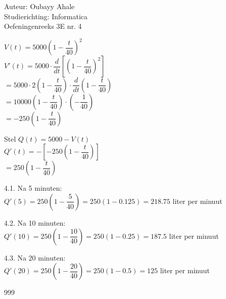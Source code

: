 \documentclass[a4paper]{article}
\begin{document}
  
\noindent \large Auteur: Oubayy Ahale          \\
\noindent \large Studierichting: Informatica   \\
\noindent \large Oefeningenreeks 3E nr. 4      \\

\medskip

\normalsize

$ V(t) = 5000 \left( 1 - \dfrac{t}{40} \right)^2 $\\

$ V'(t) = 5000 \cdot \dfrac{d}{dt} \left[ \left( 1 - \dfrac{t}{40} \right)^2 \right] $\\

$ = 5000 \cdot 2 \left( 1 - \dfrac{t}{40} \right) \cdot \dfrac{d}{dt} \left( 1 - \dfrac{t}{40} \right) $\\

$ = 10000 \left( 1 - \dfrac{t}{40} \right) \cdot \left( -\dfrac{1}{40} \right) $\\

$ = -250 \left( 1 - \dfrac{t}{40} \right) $\\

\medskip

Stel $ Q(t) = 5000 - V(t) $\\

$ Q'(t) = - \left[ -250 \left( 1 - \dfrac{t}{40} \right) \right] $\\

$ = 250 \left( 1 - \dfrac{t}{40} \right) $\\

\medskip

4.1. Na 5 minuten:\\

$ Q'(5) = 250 \left( 1 - \dfrac{5}{40} \right) = 250 \left( 1 - 0.125 \right) = 218.75 $ liter per minuut\\

\medskip

4.2. Na 10 minuten:\\

$ Q'(10) = 250 \left( 1 - \dfrac{10}{40} \right) = 250 \left( 1 - 0.25 \right) = 187.5 $ liter per minuut\\

\medskip

4.3. Na 20 minuten:\\

$ Q'(20) = 250 \left( 1 - \dfrac{20}{40} \right) = 250 \left( 1 - 0.5 \right) = 125 $ liter per minuut\\


\begin{thebibliography}{999}
\end{thebibliography}
\end{document}
